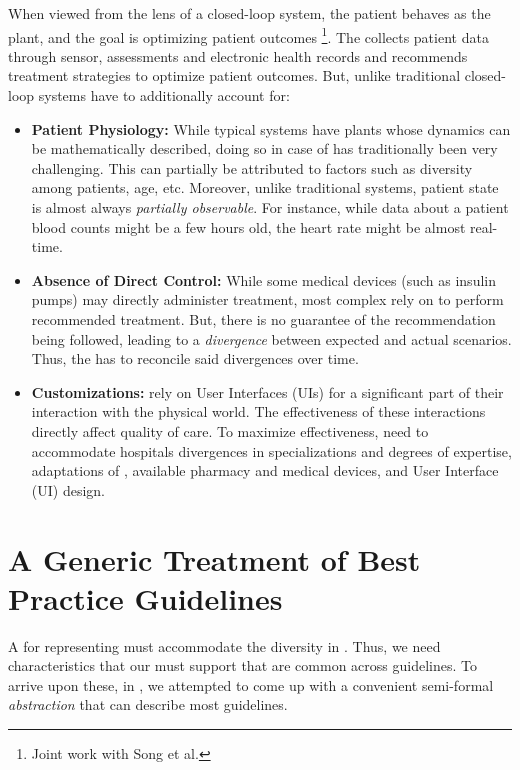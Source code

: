 When viewed from the lens of a closed-loop system, the patient behaves
as the plant, and the goal is optimizing patient outcomes
\cite{SongSMC23}\footnote{Joint work with Song et al.}. The \CDSSs{}
collects patient data through sensor, assessments and electronic
health records and recommends treatment strategies to optimize patient
outcomes. But, unlike traditional closed-loop systems
\CDSSs{} have to additionally account for:
\begin{itemize}
  \item \textbf{Patient Physiology:} While typical systems have
  plants whose dynamics can be mathematically described, doing so
  in case of \CDSSs{} has traditionally been very challenging. This
  can partially be attributed to factors such as diversity among patients,
  age, etc. Moreover, unlike traditional systems, patient state is
  almost always \emph{partially observable}. For instance,
  while data about a patient blood counts might be a few hours old,
  the heart rate might be almost real-time.
  \item \textbf{Absence of Direct Control:} While some medical devices
  (such as insulin pumps) may directly administer treatment, most
  complex \CDSSs{} rely on \HCPs{} to perform recommended treatment.
  But, there is no guarantee of the recommendation being followed,
  leading to a \emph{divergence} between expected and actual scenarios.
  Thus, the \CDSS{} has to reconcile said divergences over time.
  \item \textbf{Customizations:} \CDSSs{} rely on User Interfaces (UIs) for
  a significant part of their interaction with the physical world.
  The effectiveness of these interactions directly affect quality of care.
  To maximize effectiveness, \CDSSs{} need to accommodate
  hospitals divergences in specializations and
  degrees of expertise, adaptations of \BPGs{}, available pharmacy and medical devices,
  and User Interface (UI) design.
\end{itemize}

\section{A Generic Treatment of Best Practice Guidelines}\label{sec:generic-bpg}

A \DSL{} for representing \BPGs{} must accommodate the diversity
in \BPGs{}. Thus, we need characteristics that our \DSL{} must
support that are common across guidelines. To arrive upon these,
in \cite{SongSMC23}, we attempted
to come up with a convenient semi-formal \emph{abstraction}
that can describe most guidelines.

